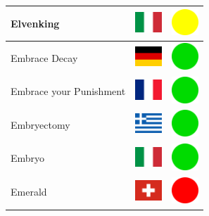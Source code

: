 \documentclass[12pt, a4paper, twoside]{report}
\begin{document}
\begin{center}
\begin{longtable}{|p{5cm}|p{2cm}|p{2cm}|}
 Elvenking                                                  & \includegraphics[width=1cm]{../4x3/it} &   \includegraphics[width=1cm]{../likes/m} \\ \hline
 Embrace Decay                                              & \includegraphics[width=1cm]{../4x3/de} &   \includegraphics[width=1cm]{../likes/y} \\ \hline
 Embrace your Punishment                                    & \includegraphics[width=1cm]{../4x3/fr} &   \includegraphics[width=1cm]{../likes/y} \\ \hline
 Embryectomy                                                & \includegraphics[width=1cm]{../4x3/gr} &   \includegraphics[width=1cm]{../likes/y} \\ \hline
 Embryo                                                     & \includegraphics[width=1cm]{../4x3/it} &   \includegraphics[width=1cm]{../likes/y} \\ \hline
 Emerald                                                    & \includegraphics[width=1cm]{../4x3/ch} &   \includegraphics[width=1cm]{../likes/n} \\ \hline

\end{longtable}
\end{center}
\end{document}
